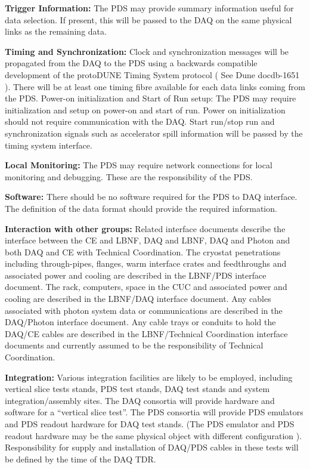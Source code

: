 \textbf{Trigger Information:} The PDS may provide summary information useful for data selection. If present, this will be passed to the DAQ on the same physical links as the remaining data.

\textbf{Timing and Synchronization: }Clock and synchronization messages will be propagated from the DAQ to the PDS using a backwards compatible development of the protoDUNE Timing System protocol ( See Dune docdb-1651 ). There will be at least one timing fibre available for each data links coming from the PDS. Power-on initialization and Start of Run setup:  The PDS may require initialization and setup on power-on and start of run. Power on initialization should not require communication with the DAQ. Start run/stop run and synchronization signals such as accelerator spill information will be passed by the timing system interface.

\textbf{Local Monitoring:} The PDS may require network connections for local monitoring and debugging. These are the responsibility of the PDS.

\textbf{Software:} There should be no software required for the PDS to DAQ interface. The definition of the data format should provide the required information. 

\textbf{Interaction with other groups: }Related interface documents describe the interface between the CE and LBNF, DAQ and LBNF, DAQ and Photon and both DAQ and CE with Technical Coordination. The cryostat penetrations including through-pipes, flanges, warm interface crates and feedthroughs and associated power and cooling are described in the LBNF/PDS interface document.  The rack, computers, space in the CUC and associated power and cooling are described in the LBNF/DAQ interface document. Any cables associated with photon system data or communications are described in the DAQ/Photon interface document. Any cable trays or conduits to hold the DAQ/CE cables are described in the LBNF/Technical Coordination interface documents and currently assumed to be the responsibility of Technical Coordination.

\textbf{Integration:} Various integration facilities are likely to be employed, including vertical slice tests stands, PDS test stands, DAQ test stands and system integration/assembly sites. The DAQ consortia will provide hardware and software for a “vertical slice test”. The PDS consortia will provide PDS emulators and PDS readout hardware for DAQ test stands. (The PDS emulator and PDS readout hardware may be the same physical object with different configuration ). Responsibility for supply and installation of DAQ/PDS cables in these tests will be defined by the time of the DAQ TDR.

